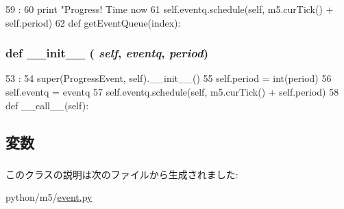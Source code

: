 \begin{DoxyCode}
59                       :
60         print "Progress! Time now %
61         self.eventq.schedule(self, m5.curTick() + self.period)
62 
def getEventQueue(index):
\end{DoxyCode}
\hypertarget{classm5_1_1event_1_1ProgressEvent_ac775ee34451fdfa742b318538164070e}{
\subsubsection[{\_\-\_\-init\_\-\_\-}]{\setlength{\rightskip}{0pt plus 5cm}def \_\-\_\-init\_\-\_\- ( {\em self}, \/   {\em eventq}, \/   {\em period})}}
\label{classm5_1_1event_1_1ProgressEvent_ac775ee34451fdfa742b318538164070e}



\begin{DoxyCode}
53                                       :
54         super(ProgressEvent, self).__init__()
55         self.period = int(period)
56         self.eventq = eventq
57         self.eventq.schedule(self, m5.curTick() + self.period)
58 
    def __call__(self):
\end{DoxyCode}


\subsection{変数}
\hypertarget{classm5_1_1event_1_1ProgressEvent_a36b1251d81fd3992cb823d7438c40f1f}{
\subsubsection[{eventq}]{}}
\label{classm5_1_1event_1_1ProgressEvent_a36b1251d81fd3992cb823d7438c40f1f}
\hypertarget{classm5_1_1event_1_1ProgressEvent_a7bf7bb97f47ddff4363c79517bb55363}{
\subsubsection[{period}]{}}
\label{classm5_1_1event_1_1ProgressEvent_a7bf7bb97f47ddff4363c79517bb55363}


このクラスの説明は次のファイルから生成されました:\begin{DoxyCompactItemize}
\item 
python/m5/\hyperlink{event_8py}{event.py}\end{DoxyCompactItemize}
